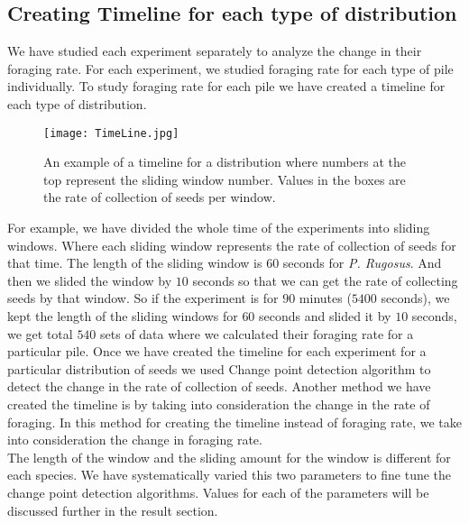  \subsection{\label{Creating Timeline for each type of distribution}Creating Timeline for each type of distribution}
 We have studied each experiment separately to analyze the change in their foraging rate. For each experiment, we studied foraging rate for each type of pile individually. To study foraging rate for each pile we have created a timeline for each type of distribution. 
 \begin{figure}[h]
 	\texttt{[image: TimeLine.jpg]}
 	\caption{An example of a timeline for a distribution where numbers at the top represent the sliding window number. Values in the boxes are the rate of collection of seeds per window.}
 \end{figure}
 For example, we have divided the whole time of the experiments into sliding windows. Where each sliding window represents the rate of collection of seeds for that time. The length of the sliding window is $60$ seconds for \textit{P. Rugosus}. And then we slided the window by $10$ seconds so that we can get the rate of collecting seeds by that window. So if the experiment is for $90$ minutes ($5400$ seconds), we kept the length of the sliding windows for $60$ seconds and slided it by $10$ seconds, we get total $540$ sets of data where we calculated their foraging rate for a particular pile. Once we have created the timeline for each experiment for a particular distribution of seeds we used Change point detection algorithm to detect the change in the rate of collection of seeds. Another method we have created the timeline is by taking into consideration the change in the rate of foraging. In this method for creating the timeline instead of foraging rate, we take into consideration the change in foraging rate.\\ 
 The length of the window and the sliding amount for the window is different for each species. We have systematically varied this two parameters to fine tune the change point detection algorithms. Values for each of the parameters will be discussed further in the result section. 
